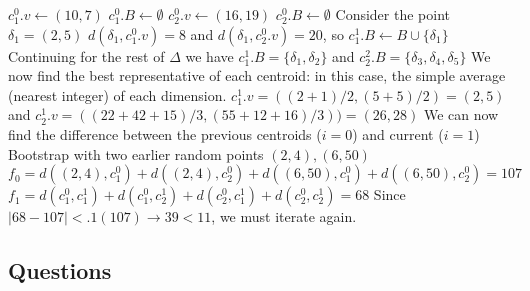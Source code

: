 \documentclass{article}
\begin{document}
\begin{center}
\begin{algorithmic}[1]
\State $c_1^0.v \gets (10,7)$
\State $c_1^0.B \gets \emptyset$
\State $c_2^0.v \gets (16,19)$
\State $c_2^0.B \gets \emptyset$
\State Consider the point $\delta_1 = (2,5)$
\State $d(\delta_1, c_1^0.v) = 8$ and $d(\delta_1, c_2^0.v) = 20$, so $c_1^1.B \gets B \cup \{\delta_1\}$
\State Continuing for the rest of $\Delta$ we have $c_1^1.B = \{\delta_1, \delta_2\}$ and $c_2^2.B = \{\delta_3, \delta_4, \delta_5\}$
\State We now find the best representative of each centroid: in this case, the simple average (nearest integer) of each dimension.
\State $c_1^1.v = ((2+1)/2, (5+5)/2) = (2,5)$ and $c_2^1.v = ((22+42+15)/3, (55+12+16)/3))= (26, 28)$
\State We can now find the difference between the previous centroids ($i=0$) and current ($i=1$)
\State Bootstrap with two earlier random points $(2,4), (6,50)$
\State $f_0 = d((2,4), c_1^0) + d((2,4),c_2^0) + d((6,50), c_1^0) + d((6,50),c_2^0)= 107$
\State $f_1 = d(c_1^0, c_1^1) + d(c_1^0, c_2^1) + d(c_2^0, c_1^1) + d(c_2^0, c_2^1) =68$
\State Since $|68 - 107| < .1(107) \rightarrow 39 < 11$, we must iterate again.
\end{algorithmic}
\end{center}


\subsection{Questions}
\end{document}
